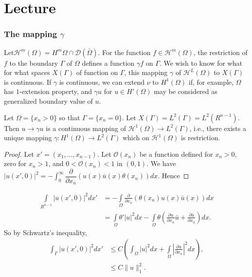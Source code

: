 \chapter{Lecture}\label{lec4}
 
\setcounter{section}{2}
\subsection{The mapping \texorpdfstring{$\gamma$}{gamma}}\label{lec4:sec2:subsec4}
 
Let\pageoriginale $\mathscr{H}^m(\Omega)=H^m\Omega \cap 
\mathscr{D}(\bar{\Omega})$.  For 
 the function $f \in \mathscr{H}^m(\Omega)$, the restriction
 of $f$ to the boundary $\Gamma$ of $\Omega$ defines a function
 $\gamma f$ on $\Gamma$. We wish to know for what for what spaces
 $X(\Gamma)$ of function on $\Gamma$, this mapping $\gamma$ of
 $\mathscr{H}^L (\Omega)$ to $X(\Gamma)$ is continuous. If $\gamma$ is
 continuous, we can extend $\nu$ to $H^1(\Omega)$ if, for example,
 $\Omega$ has $1$-extension property, and $\gamma u$ for $u
 \in H'(\Omega)$ may be considered as generalized boundary value
 of $u$. 

 \begin{theorem}\label{lec4:sec2:subsec4:thm2.5}%
   Let $\Omega = \{ x_n >0 \}$ so that $\Gamma = \{ x_n =0 \}$. Let
   $X(\Gamma)=L^2 (\Gamma)=L^2 (R^{n-1})$. Then $u \to \gamma u$ is a
   continuous mapping of $\mathscr{H}^1(\Omega)\to L^2 (\Gamma)$, i.e.,
   there exists a unique mapping $\gamma : H^1(\Omega)\to L^2(\Gamma)$
   which on $\mathscr{H}^1 (\Omega)$ is restriction. 
 \end{theorem} 

 \begin{proof}
   Let $x'=(x_1, \ldots ,x_{n-1})$. Let $\mathscr{O}(x_n)$ be a function
   defined for $x_n>0$, zero for $x_n >1$, and $0< \mathscr{O}(x_n)<1$ in
   $(0,1)$. We have $|u(x',0)|^2 =- \int ^\infty _0
   \dfrac{\partial}{\partial x_n}(u(x)\bar{u}(x)\theta (x_n))dx$. Hence 
 \end{proof} 

 \begin{align*}
   \int\limits _{R^{n-1}}|u (x',0)|^2 dx' & =-\int \limits_ \Omega
   \frac{\partial}{\partial x_n}(\theta (x_n)u(x)\bar{u}(x))dx\\ 
   &=\int \limits_ \Omega \theta '|u|^2 dx -\int \limits_ \Omega \theta
   (\frac{\partial u}{\partial x_n} \bar{u} + \frac{\partial
     \bar{u}}{\partial x_n})dx. 
 \end{align*} 
 So by Schwartz's inequality,
 \begin{align*}
\int_ \Gamma |u(x',0)|^2 dx' & \le C(\int _\Omega |u|^2 dx + \int
\limits_ \Omega |\frac{\partial u}{\partial x_n}|^2 dx),\\ 
 & \le C \parallel u \parallel ^2_1.
 \end{align*}


